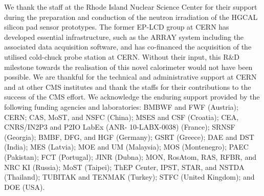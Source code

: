 \acknowledgments
We thank the staff at the Rhode Island Nuclear Science Center for their support during the preparation and conduction of the neutron irradiation of the HGCAL silicon pad sensor prototypes.
The former EP-LCD group at CERN has developed essential infrastructure, such as the ARRAY system including the associated data acquisition software, and has co-financed the acquisition of the utilised cold-chuck probe station at CERN.
Without their input, this R$\&$D milestone towards the realisation of this novel calorimeter would not have been possible. 
We are thankful for the technical and administrative support at CERN and at other CMS institutes and thank the staffs for their contributions to the success of the CMS effort. 
We acknowledge the enduring support provided by the following funding agencies and laboratories: BMBWF and FWF (Austria); CERN; CAS, MoST, and NSFC (China); MSES and CSF (Croatia); CEA, CNRS/IN2P3 and P2IO LabEx (ANR- 10-LABX-0038) (France); SRNSF (Georgia); BMBF, DFG, and HGF (Germany); GSRT (Greece); DAE and DST (India); MES (Latvia); MOE and UM (Malaysia); MOS (Montenegro); PAEC (Pakistan); FCT (Portugal); JINR (Dubna); MON, RosAtom, RAS, RFBR, and NRC KI (Russia); MoST (Taipei); ThEP Center, IPST, STAR, and NSTDA (Thailand); TUBITAK and TENMAK (Turkey); STFC (United Kingdom); and DOE (USA).
